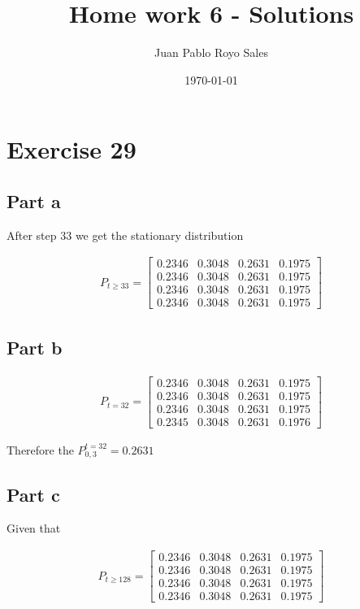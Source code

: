 \documentclass[12pt, a4paper]{article}
\title{Home work 6 - Solutions}
\author{Juan Pablo Royo Sales}
\date\today
\begin{document}
\maketitle

\section{Exercise 29}
\subsection{Part a}

After step 33 we get the stationary distribution

\begin{align*}
P_{t \geq 33} = \begin{bmatrix}
  0.2346 & 0.3048 & 0.2631 & 0.1975\\
  0.2346 & 0.3048 & 0.2631 & 0.1975\\
  0.2346 & 0.3048 & 0.2631 & 0.1975\\
  0.2346 & 0.3048 & 0.2631 & 0.1975
\end{bmatrix}
\end{align*}

\subsection{Part b}

\begin{align*}
  P_{t = 32} = \begin{bmatrix}
    0.2346 & 0.3048 & 0.2631 & 0.1975\\
    0.2346 & 0.3048 & 0.2631 & 0.1975\\
    0.2346 & 0.3048 & 0.2631 & 0.1975\\
    0.2345 & 0.3048 & 0.2631 & 0.1976
  \end{bmatrix}
\end{align*}

Therefore the $P_{0,3}^{t=32} = 0.2631$

\subsection{Part c}
Given that

\begin{align*}
  P_{t \geq 128} = \begin{bmatrix}
    0.2346 & 0.3048 & 0.2631 & 0.1975\\
    0.2346 & 0.3048 & 0.2631 & 0.1975\\
    0.2346 & 0.3048 & 0.2631 & 0.1975\\
    0.2346 & 0.3048 & 0.2631 & 0.1975
  \end{bmatrix}
\end{align*}
\end{document}
